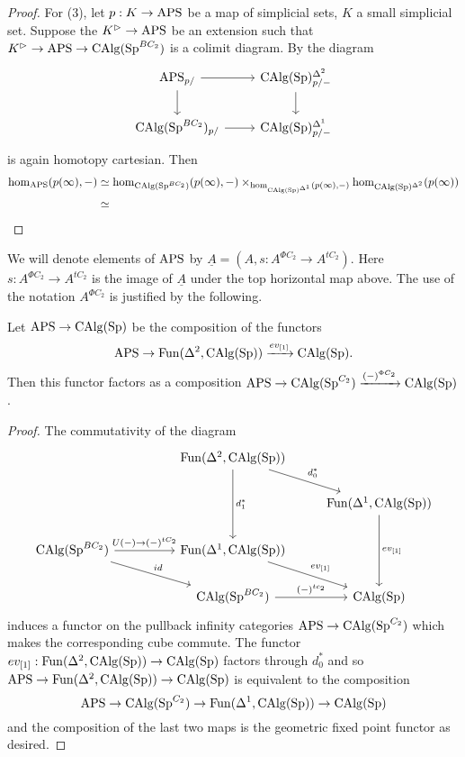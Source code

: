 \begin{proof}
    For (3), let $p:K\to \mathrm{APS}$ be a map of simplicial sets, $K$ a small simplicial set. Suppose the $K^\vartriangleright\to \mathrm{APS}$ be an extension such that $K^\vartriangleright\to \mathrm{APS}\to \operatorname{CAlg}(\operatorname{Sp}^{BC_2})$ is a colimit diagram. By \cite[Proposition 2.4.3.2]{HTT} the diagram \[\begin{tikzcd}
        \aps_{p/}\arrow[r]\arrow[d] &\CAlg(\Spectra)^{\Delta^2}_{p/-}\arrow[d]\\
        \CAlg(\Spectra^{BC_2})_{p/}\arrow[r] & \CAlg(\Spectra)^{\Delta^1}_{p/-}
    \end{tikzcd}\] is again homotopy cartesian. Then 
    \begin{align*}
        \hom_{\mathrm{APS}}(p(\infty), -)&\simeq \hom_{\operatorname{CAlg}(\operatorname{Sp}^{BC_2})}(p(\infty), -)\times_{\hom_{\operatorname{CAlg}(\operatorname{Sp})^{\Delta^1}}(p(\infty),-)}\hom_{\operatorname{CAlg}(\operatorname{Sp})^{\Delta^2}}(p(\infty))\\
        &\simeq 
    \end{align*}
\end{proof}

We will denote elements of $\mathrm{APS}$ by $\underline{A}=(A,s:A^{\Phi C_2}\to A^{tC_2})$. Here $s:A^{\Phi C_2}\to A^{tC_2}$ is the image of $\underline{A}$ under the top horizontal map above. The use of the notation $A^{\Phi C_2}$ is justified by the following.

\begin{lemma}
Let $\mathrm{APS}\to \operatorname{CAlg}(\operatorname{Sp})$ be the composition of the functors \[\mathrm{APS}\to \operatorname{Fun}(\Delta^2,\operatorname{CAlg}(\operatorname{Sp}))\xrightarrow{ev_{[1]}}\operatorname{CAlg}(\operatorname{Sp}).\] Then this functor factors as a composition $\mathrm{APS}\to \operatorname{CAlg}(\operatorname{Sp}^{C_2})\xrightarrow{(-)^{\Phi C_2}}\operatorname{CAlg}(\operatorname{Sp})$. 
\end{lemma}
\begin{proof}
The commutativity of the diagram
\[
\begin{tikzcd}
 & & \operatorname{Fun}(\Delta^2, \CAlg(\Spectra)) \arrow[rd, "d_0^*"] \arrow[dd, "d_1^*"] & \\
 & & & \operatorname{Fun}(\Delta^1,\CAlg(\Spectra)) \arrow[dd,"ev_{[1]}"]\\
\CAlg(\Spectra^{BC_2}) \arrow[rr, "U(-)\to (-)^{tC_2}"] \arrow[rrd, "id"] & & \operatorname{Fun}(\Delta^1, \CAlg(\Spectra)) \arrow[rd, "ev_{[1]}"] & \\
  & & \CAlg(\Spectra^{BC_2}) \arrow[r, "(-)^{tc_2}"] & \CAlg(\Spectra)
\end{tikzcd}
\] induces a functor on the pullback infinity categories $\mathrm{APS}\to \operatorname{CAlg}(\operatorname{Sp}^{C_2})$ which makes the corresponding cube commute. The functor $ev_{[1]}:\operatorname{Fun}(\Delta^2, \operatorname{CAlg}(\operatorname{Sp}))\to \operatorname{CAlg}(\operatorname{Sp})$ factors through $d_0^*$ and so $\mathrm{APS}\to \operatorname{Fun}(\Delta^2, \operatorname{CAlg}(\operatorname{Sp}))\to \operatorname{CAlg}(\operatorname{Sp})$ is equivalent to the composition \[\mathrm{APS}\to \operatorname{CAlg}(\operatorname{Sp}^{C_2})\to \operatorname{Fun}(\Delta^1,\operatorname{CAlg}(\operatorname{Sp}))\to \operatorname{CAlg}(\operatorname{Sp})\] and the composition of the last two maps is the geometric fixed point functor as desired.
\end{proof}

